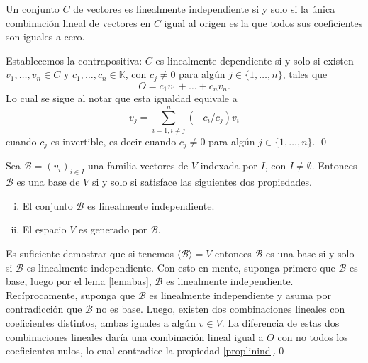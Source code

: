 \begin{prop}\label{proplinind}
Un conjunto $C$ de vectores es linealmente independiente si y solo si la única combinación lineal de vectores en $C$ igual al origen es la que todos sus coeficientes son iguales a cero.
\end{prop}

\dem Establecemos la contrapositiva: $C$ es linealmente dependiente si y solo si existen $v_1,\ldots,v_n\in C$ y $c_1,\ldots,c_n\in \mathbb{K}$, con $c_j\ne 0$ para alg\'un $j\in\{1,\ldots, n\}$, tales que
\[
O=c_1v_1+\ldots+c_nv_n.
\]
Lo cual se sigue al notar que esta igualdad equivale a
\[
v_j=\sum_{i=1,i\ne j}^n (-c_i/c_j)v_i
\]
cuando $c_j$ es invertible, es decir cuando $c_j\ne 0$ para algún $j\in\{1,\ldots,n\}$.
\qed

\begin{teo}\label{defbase2}
Sea $\mathcal{B}=(v_i)_{i\in I}$ una familia vectores de $V$ indexada por $I$, con $I\ne\emptyset$. Entonces $\mathcal{B}$ es una base de $V$ si y solo si satisface las siguientes dos propiedades.
\begin{enumerate}[(i)]
\item El conjunto $\mathcal{B}$ es linealmente independiente.
\item El espacio $V$ es generado por $\mathcal{B}$.
\end{enumerate}
\end{teo}

\dem Es suficiente demostrar que si tenemos $\langle \mathcal{B}\rangle=V$ entonces $\mathcal{B}$ es una base si y solo si $\mathcal{B}$ es linealmente independiente. Con esto en mente, suponga primero que $\mathcal{B}$ es base, luego por el lema \ref{lemabas}, $\mathcal{B}$ es linealmente independiente. Recíprocamente, suponga que $\mathcal{B}$ es linealmente independiente y asuma por contradicci\'on que $\mathcal{B}$ no es base. Luego, existen dos combinaciones lineales con coeficientes distintos, ambas iguales a alg\'un $v\in V$. La diferencia de estas dos combinaciones lineales dar\'ia una combinaci\'on lineal igual a $O$ con no todos los coeficientes nulos, lo cual contradice la propiedad \ref{proplinind}.\qed

